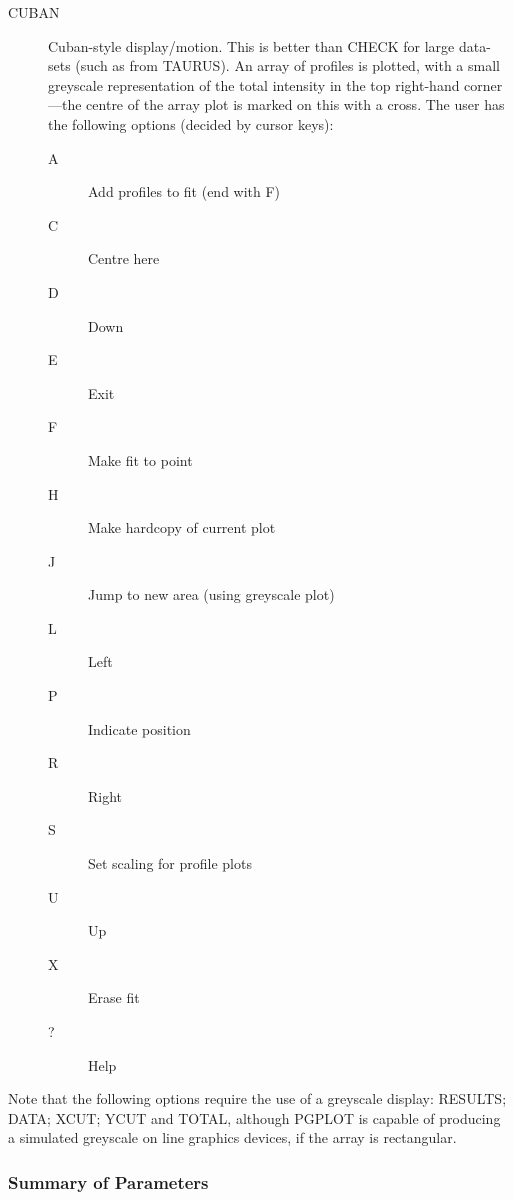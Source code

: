 \begin{description}
\item[CUBAN] Cuban-style display/motion.
This is better than CHECK for large data-sets (such as from TAURUS).
An array of profiles is plotted, with a small greyscale representation
of the total intensity in the top right-hand corner---the centre of the
array plot is marked on this with a cross.
The user has the following options (decided by cursor keys):
\begin{description}
\item[A] Add profiles to fit (end with F)
\item[C] Centre here
\item[D] Down
\item[E] Exit
\item[F] Make fit to point
\item[H] Make hardcopy of current plot
\item[J] Jump to new area (using greyscale plot)
\item[L] Left
\item[P] Indicate position
\item[R] Right
\item[S] Set scaling for profile plots
\item[U] Up
\item[X] Erase fit
\item[?] Help
\end{description}
\end{description}
Note that the following options require the use of a greyscale display:
RESULTS; DATA; XCUT; YCUT and TOTAL, although PGPLOT is capable of
producing a simulated greyscale on line graphics devices, if the array
is rectangular.

\subsubsection{Summary of Parameters}

